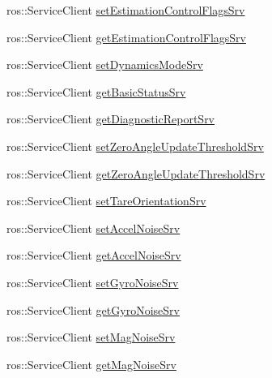 \begin{DoxyCompactItemize}
\item 
ros\+::\+Service\+Client \hyperlink{classcl__microstrain__mips_1_1ClMicrostainMips_a2eeff01aea4a41fd5d24ff2f77daf584}{set\+Estimation\+Control\+Flags\+Srv}
\item 
ros\+::\+Service\+Client \hyperlink{classcl__microstrain__mips_1_1ClMicrostainMips_a64039ee26cf8a290b3c22b787b8868a5}{get\+Estimation\+Control\+Flags\+Srv}
\item 
ros\+::\+Service\+Client \hyperlink{classcl__microstrain__mips_1_1ClMicrostainMips_a43a684f4010debc4a2ba17d9784712d6}{set\+Dynamics\+Mode\+Srv}
\item 
ros\+::\+Service\+Client \hyperlink{classcl__microstrain__mips_1_1ClMicrostainMips_ab2d9efccc6237800a890135a4249eaf8}{get\+Basic\+Status\+Srv}
\item 
ros\+::\+Service\+Client \hyperlink{classcl__microstrain__mips_1_1ClMicrostainMips_a3d4329c798aa4b7cab1320f35f270192}{get\+Diagnostic\+Report\+Srv}
\item 
ros\+::\+Service\+Client \hyperlink{classcl__microstrain__mips_1_1ClMicrostainMips_a88ffc1e573993764bb130c97cc64fe08}{set\+Zero\+Angle\+Update\+Threshold\+Srv}
\item 
ros\+::\+Service\+Client \hyperlink{classcl__microstrain__mips_1_1ClMicrostainMips_ae720970f4114e7b6524b59df405ede83}{get\+Zero\+Angle\+Update\+Threshold\+Srv}
\item 
ros\+::\+Service\+Client \hyperlink{classcl__microstrain__mips_1_1ClMicrostainMips_affd28a64d0ee9bcdb116d974f5e19ec6}{set\+Tare\+Orientation\+Srv}
\item 
ros\+::\+Service\+Client \hyperlink{classcl__microstrain__mips_1_1ClMicrostainMips_aed9dd96ff81966ea1fce03173a05bcd8}{set\+Accel\+Noise\+Srv}
\item 
ros\+::\+Service\+Client \hyperlink{classcl__microstrain__mips_1_1ClMicrostainMips_ae34d6cfd5e2e990d2fa3afab20ca9c01}{get\+Accel\+Noise\+Srv}
\item 
ros\+::\+Service\+Client \hyperlink{classcl__microstrain__mips_1_1ClMicrostainMips_a712c389ca54fa2ebe89ffd601b03bd37}{set\+Gyro\+Noise\+Srv}
\item 
ros\+::\+Service\+Client \hyperlink{classcl__microstrain__mips_1_1ClMicrostainMips_a7876569caf3e8169a1972ad8a591c772}{get\+Gyro\+Noise\+Srv}
\item 
ros\+::\+Service\+Client \hyperlink{classcl__microstrain__mips_1_1ClMicrostainMips_a0a6ed1132b9cca45536598e78c8b23cc}{set\+Mag\+Noise\+Srv}
\item 
ros\+::\+Service\+Client \hyperlink{classcl__microstrain__mips_1_1ClMicrostainMips_a858136430bc226e36390517f28687a2a}{get\+Mag\+Noise\+Srv}

\end{DoxyCompactItemize}
